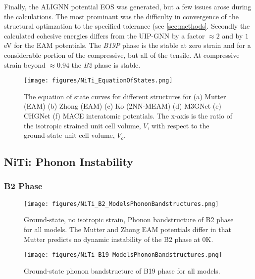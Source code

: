 \documentclass[preprint,colorlinks=true,linkcolor=black,citecolor=black]{elsarticle}
\begin{document}
Finally, the ALIGNN potential EOS was generated, but a few issues arose during the calculations. The most prominant was the difficulty in convergence of the structural optimzation to the specified tolerance (see \ref{sec:methods}. Secondly the calculated cohesive energies differs from the UIP-GNN by a factor $\approx 2$ and by $1$ eV for the EAM potentials. The \textit{B19P} phase is the stable at zero strain and for a considerable portion of the compressive, but all of the tensile. At compressive strain beyond $\approx 0.94$ the \textit{B2} phase is stable. 



\begin{figure}[ht!]
    \begin{centering}
        \texttt{[image: figures/NiTi\_EquationOfStates.png]}
        \caption{
            The equation of state curves for different  structures for (a) Mutter (EAM) (b) Zhong (EAM) (c) Ko (2NN-MEAM) (d) M3GNet (e) CHGNet (f) MACE interatomic potentials. The x-axis is the ratio of the isotropic strained unit cell volume, $V$,  with respect to the ground-state unit cell volume, $V_o$.
        }
        \label{fig:eos}
    \end{centering}
\end{figure}

\subsection{NiTi: Phonon Instability}
\label{subsec:niphonons}


\subsubsection{B2 Phase}
\label{subsubsec:b2}

\begin{figure}[!htp]
    \begin{centering}
        \texttt{[image: figures/NiTi\_B2\_ModelsPhononBandstructures.png]}
        \caption{
          Ground-state, no isotropic strain, Phonon bandstructure of B2 phase for all models. The Mutter and Zhong EAM potentials differ in that Mutter predicts no dynamic instability of the B2 phase at 0K. 
        }
        \label{fig:allmodels_b2}
    \end{centering}
\end{figure}

\begin{figure}[!htp]
    \begin{centering}
        \texttt{[image: figures/NiTi\_B19\_ModelsPhononBandstructures.png]}
        \caption{
          Ground-state phonon bandstructure of B19 phase for all models.
        }
        \label{fig:allmodels_B19P}
    \end{centering}
\end{figure}
\end{document}
